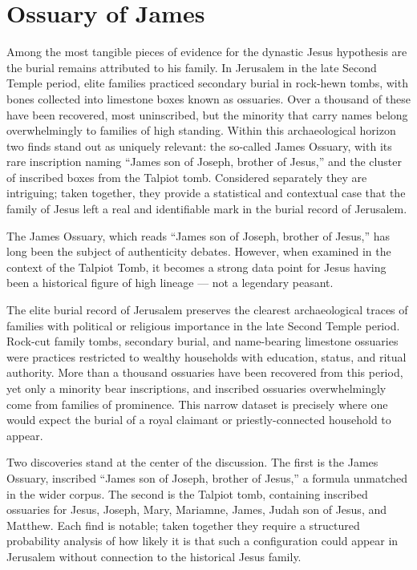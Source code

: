 \section{Ossuary of James}\label{sec:ossuary-of-james}
Among the most tangible pieces of evidence for the dynastic Jesus hypothesis are the burial remains attributed to his family.
In Jerusalem in the late Second Temple period, elite families practiced secondary burial in rock-hewn tombs, with bones collected into limestone boxes known as ossuaries.
Over a thousand of these have been recovered, most uninscribed, but the minority that carry names belong overwhelmingly to families of high standing.
Within this archaeological horizon two finds stand out as uniquely relevant: the so-called James Ossuary, with its rare inscription naming “James son of Joseph, brother of Jesus,” and the cluster of inscribed boxes from the Talpiot tomb.
Considered separately they are intriguing; taken together, they provide a statistical and contextual case that the family of Jesus left a real and identifiable mark in the burial record of Jerusalem.

The James Ossuary, which reads ``James son of Joseph, brother of Jesus,'' has long been the subject of authenticity debates.
However, when examined in the context of the Talpiot Tomb, it becomes a strong data point for Jesus having been a historical figure of high lineage --- not a legendary peasant.

The elite burial record of Jerusalem preserves the clearest archaeological traces of families with political or religious importance in the late Second Temple period.
Rock-cut family tombs, secondary burial, and name-bearing limestone ossuaries were practices restricted to wealthy households with education, status, and ritual authority.
More than a thousand ossuaries have been recovered from this period, yet only a minority bear inscriptions, and inscribed ossuaries overwhelmingly come from families of prominence.
This narrow dataset is precisely where one would expect the burial of a royal claimant or priestly-connected household to appear.

Two discoveries stand at the center of the discussion.
The first is the James Ossuary, inscribed ``James son of Joseph, brother of Jesus,'' a formula unmatched in the wider corpus.
The second is the Talpiot tomb, containing inscribed ossuaries for Jesus, Joseph, Mary, Mariamne, James, Judah son of Jesus, and Matthew.
Each find is notable; taken together they require a structured probability analysis of how likely it is that such a configuration could appear in Jerusalem without connection to the historical Jesus family.

